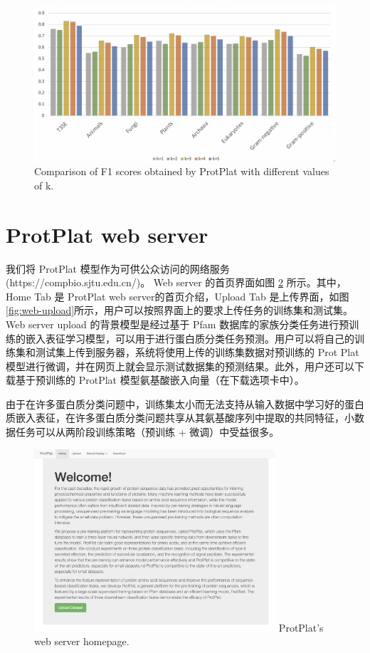 \begin{figure}[!htbp] 
\centering
\includegraphics[width=1\textwidth]  {imgs/k-mer.png}
        {Comparison of F1 scores obtained by ProtPlat with different values of k.}
\label{fig:k-mer}
\end{figure}


\section{ProtPlat web server}
我们将 ProtPlat 模型作为可供公众访问的网络服务 (https://compbio.sjtu.edu.cn/)。 Web server 的首页界面如图 \ref{fig:web-home} 所示。其中，Home Tab 是 ProtPlat web server的首页介绍，Upload Tab 是上传界面，如图 \ref{fig:web-upload}所示，用户可以按照界面上的要求上传任务的训练集和测试集。Web server upload 的背景模型是经过基于 Pfam 数据库的家族分类任务进行预训练的嵌入表征学习模型，可以用于进行蛋白质分类任务预测。用户可以将自己的训练集和测试集上传到服务器，系统将使用上传的训练集数据对预训练的 Prot Plat 模型进行微调，并在网页上就会显示测试数据集的预测结果。此外，用户还可以下载基于预训练的 ProtPlat 模型氨基酸嵌入向量（在下载选项卡中）。

由于在许多蛋白质分类问题中，训练集太小而无法支持从输入数据中学习好的蛋白质嵌入表征，在许多蛋白质分类问题共享从其氨基酸序列中提取的共同特征，小数据任务可以从两阶段训练策略（预训练 + 微调）中受益很多。


\begin{figure}[!htbp] 
\centering
\includegraphics[width=0.8\textwidth]  {imgs/web-home.png}
        {ProtPlat's web server homepage.}
\label{fig:web-home}
\end{figure}

